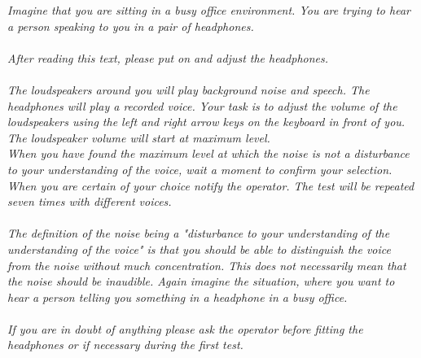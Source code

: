 \textit{Imagine that you are sitting in a busy office environment. You are trying to hear a person speaking to you in a pair of headphones. \\\\
After reading this text, please put on and adjust the headphones.\\\\
The loudspeakers around you will play background noise and speech. The headphones will play a recorded voice. Your task is to adjust the volume of the loudspeakers using the left and right arrow keys on the keyboard in front of you. The loudspeaker volume will start at maximum level. \\
When you have found the maximum level at which the noise is not a disturbance to your understanding of the voice, wait a moment to confirm your selection. When you are certain of your choice notify the operator. 
The test will be repeated seven times with different voices. \\\\
The definition of the noise being a "disturbance to your understanding of the understanding of the voice" is that you should be able to distinguish the voice from the noise without much concentration. This does not necessarily mean that the noise should be inaudible. Again imagine the situation, where you want to hear a person telling you something in a headphone in a busy office.\\\\ 
If you are in doubt of anything please ask the operator before fitting the headphones or if necessary during the first test.}


